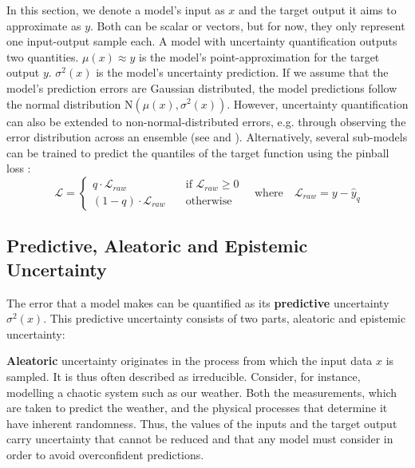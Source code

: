 \newpar In this section, we denote a model's input as $x$ and the target output it aims to approximate as $y$. Both can be scalar or vectors, but for now, they only represent one input-output sample each. A model with uncertainty quantification outputs two quantities. $\mu(x) \approx y$ is the model's point-approximation for the target output $y$. $\sigma^2(x)$ is the model's uncertainty prediction. If we assume that the model's prediction errors are Gaussian distributed, the model predictions follow the normal distribution $\text{N}(\mu(x), \sigma^2(x))$. However, uncertainty quantification can also be extended to non-normal-distributed errors, e.g. through observing the error distribution across an ensemble (see  and ). Alternatively, several sub-models can be trained to predict the quantiles of the target function using the pinball loss \cite{regression-quantiles-1978, deep-quantiles-2022}:
\begin{equation*}
    \mathcal{L} = \begin{cases}
        q \cdot \mathcal{L}_{raw} \quad &\text{if } \mathcal{L}_{raw} \geq 0 \\
        (1-q) \cdot \mathcal{L}_{raw} \quad &\text{otherwise}
    \end{cases} \quad \text{where} \quad \mathcal{L}_{raw} = y - \hat{y}_{q}
\end{equation*}

\subsection{Predictive, Aleatoric and Epistemic Uncertainty} \label{txt:aleatoic-epistemic-uncertainty}

The error that a model makes can be quantified as its \textbf{predictive} uncertainty $\sigma^2(x)$. This predictive uncertainty consists of two parts, aleatoric and epistemic uncertainty:

\textbf{Aleatoric} uncertainty originates in the process from which the input data $x$ is sampled. It is thus often described as irreducible. Consider, for instance, modelling a chaotic system such as our weather. Both the measurements, which are taken to predict the weather, and the physical processes that determine it have inherent randomness. Thus, the values of the inputs and the target output carry uncertainty that cannot be reduced and that any model must consider in order to avoid overconfident predictions.

